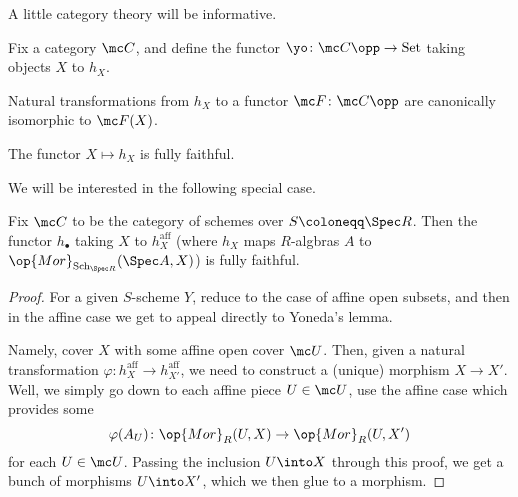 \documentclass[../notes.tex]{subfiles}
\begin{document}
A little category theory will be informative.
\begin{thm}
	Fix a category $\mc C$, and define the functor $\yo\colon\mc C\opp\to\mathrm{Set}$ taking objects $X$ to $h_X$.
	\begin{listalph}
		\item Natural transformations from $h_X$ to a functor $\mc F\colon\mc C\opp$ are canonically isomorphic to $\mc F(X)$.
		\item The functor $X\mapsto h_X$ is fully faithful.
	\end{listalph}
\end{thm}
We will be interested in the following special case.
\begin{corollary}
	Fix $\mc C$ to be the category of schemes over $S\coloneqq\Spec R$. Then the functor $h_\bullet$ taking $X$ to $h_X^{\mathrm{aff}}$ (where $h_X$ maps $R$-algbras $A$ to $\op{Mor}_{\mathrm{Sch}_{\Spec R}}(\Spec A,X)$) is fully faithful.
\end{corollary}
\begin{proof}
	For a given $S$-scheme $Y$, reduce to the case of affine open subsets, and then in the affine case we get to appeal directly to Yoneda's lemma.

	Namely, cover $X$ with some affine open cover $\mc U$. Then, given a natural transformation $\varphi\colon h_X^{\mathrm{aff}}\to h_{X'}^{\mathrm{aff}}$, we need to construct a (unique) morphism $X\to X'$. Well, we simply go down to each affine piece $U\in\mc U$, use the affine case which provides some
	\[\varphi(A_U)\colon\op{Mor}_R(U,X)\to\op{Mor}_R(U,X')\]
	for each $U\in\mc U$. Passing the inclusion $U\into X$ through this proof, we get a bunch of morphisms $U\into X'$, which we then glue to a morphism.
\end{proof}
\end{document}

